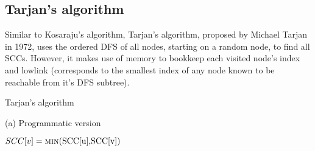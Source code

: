 \subsection{Tarjan's algorithm} \label{algorithm-scc-tarjan}
Similar to Kosaraju's algorithm, Tarjan's algorithm, proposed by Michael Tarjan in 1972, \cite{tarjan72} uses the ordered DFS of all nodes, starting on a random node, to find all SCCs. However, it makes use of memory to bookkeep each visited node's index and lowlink (corresponds to the smallest index of any node known to be reachable from it's DFS subtree). 
\begin{center}
    \begin{algorithm}
        \caption{Tarjan's algorithm}
        \label{alg-tarjan}
        \begin{minipage}[t]{0.80\linewidth}
            (a) Programmatic version
            \begin{algorithmic}[1]


                         {}
                        \EndIf
                         {$SCC[v] = \Call{min}{$SCC[u]$, $SCC[v]$}$}
                        \EndIf
                    \EndFor

                        \EndWhile
                    \EndIf
                \EndFunction

                    \EndFor
                        \EndIf
                    \EndFor
                    \State {}
                \EndFunction
            \end{algorithmic}
        \end{minipage}
    \end{algorithm}
\end{center}